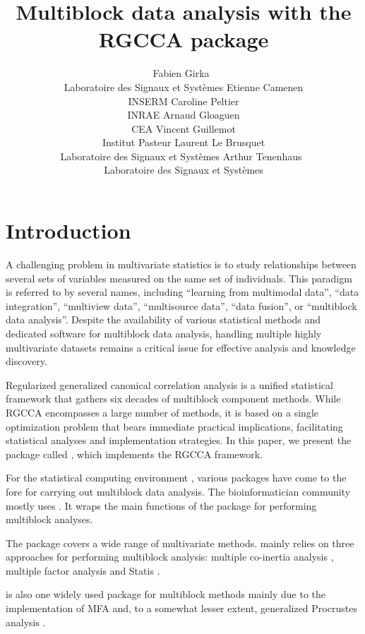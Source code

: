 \documentclass[
]{jss}
\author{
Fabien Girka~\orcidlink{0000-0003-2843-1104}\\Laboratoire des Signaux et
Systèmes \And Etienne Camenen\\INSERM \And Caroline Peltier\\INRAE
\AND Arnaud Gloaguen\\CEA \And Vincent Guillemot\\Institut Pasteur
\AND Laurent Le Brusquet\\Laboratoire des Signaux et
Systèmes \And Arthur
Tenenhaus~\orcidlink{0000-0003-3459-1518}\\Laboratoire des Signaux et
Systèmes
}
\title{Multiblock data analysis with the RGCCA package}
\begin{document}
\newtheorem{theorem}{theorem}[section]%
\newtheorem{lemma}[theorem]{Lemma}
\newtheorem{proposition}[theorem]{Proposition}
\newtheorem{corollary}[theorem]{Corollary}
\newtheorem{remark}[theorem]{Remark}

\hypertarget{introduction}{%
\section{Introduction}\label{introduction}}

A challenging problem in multivariate statistics is to study
relationships between several sets of variables measured on the same set
of individuals. This paradigm is referred to by several names, including
``learning from multimodal data'', ``data integration'', ``multiview
data'', ``multisource data'', ``data fusion'', or ``multiblock data
analysis''. Despite the availability of various statistical methods and
dedicated software for multiblock data analysis, handling multiple
highly multivariate datasets remains a critical issue for effective
analysis and knowledge discovery.

Regularized generalized canonical correlation analysis
\citep[RGCCA,][]{Tenenhaus2011, Tenenhaus2014, Tenenhaus2015, Tenenhaus2017}
is a unified statistical framework that gathers six decades of
multiblock component methods. While RGCCA encompasses a large number of
methods, it is based on a single optimization problem that bears
immediate practical implications, facilitating statistical analyses and
implementation strategies. In this paper, we present the 
package called , which implements the RGCCA framework.

For the statistical computing environment  \citep{R2022},
various  packages have come to the fore for carrying out
multiblock data analysis. The bioinformatician community mostly uses
 \citep{Rohart2017}. It wraps the main functions of the
 package for performing multiblock analyses.

The  package \citep{Dray2007} covers a wide range of
multivariate methods.  mainly relies on three approaches for
performing multiblock analysis: multiple co-inertia analysis
\citep[MCOA, ][]{Chessel1996}, multiple factor analysis
\citep[MFA,][]{Escofier1994} and Statis \citep{Lavit1994}.

 \citep{Le2008} is also one widely used package for
multiblock methods mainly due to the implementation of MFA and, to a
somewhat lesser extent, generalized Procrustes analysis
\citep[GPA,][]{Gower1975}.
\end{document}
